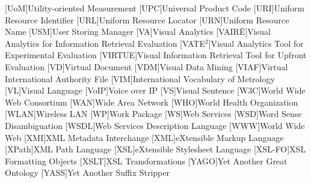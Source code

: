 [UoM]{Utility-oriented Measurement}
[UPC]{Universal Product Code}
[URI]{Uniform Resource Identifier}
[URL]{Uniform Resource Locator}
[URN]{Uniform Resource Name}
[USM]{User Storing Manager}
[VA]{Visual Analytics}
[VAIR\"{E}]{Visual Analytics for Information Retrieval Evaluation}
[VATE$^2$]{Visual Analytics Tool for Experimental Evaluation}
[VIRTUE]{Visual Information Retrieval Tool for Upfront Evaluation}
[VD]{Virtual Document}
[VDM]{Visual Data Mining}
[VIAF]{Virtual International Authority File}
[VIM]{International Vocabulary of Metrology}
[VL]{Visual Language}
[VoIP]{Voice over IP}
[VS]{Visual Sentence}
[W3C]{World Wide Web Consortium}
[WAN]{Wide Area Network}
[WHO]{World Health Organization}
[WLAN]{Wireless \acs{LAN}}
[WP]{Work Package}
[WS]{Web Services}
[WSD]{Word Sense Disambiguation}
[WSDL]{Web Services Description Language}
[WWW]{World Wide Web}
[XMI]{\acs{XML} Metadata Interchange}
[XML]{eXtensible Markup Language}
[XPath]{XML Path Language}
[XSL]{eXtensible Stylesheet Language}
[XSL-FO]{\acs{XSL} Formatting Objects}
[XSLT]{\acs{XSL} Transformations}
[YAGO]{Yet Another Great Ontology}
[YASS]{Yet Another Suffix Stripper}
